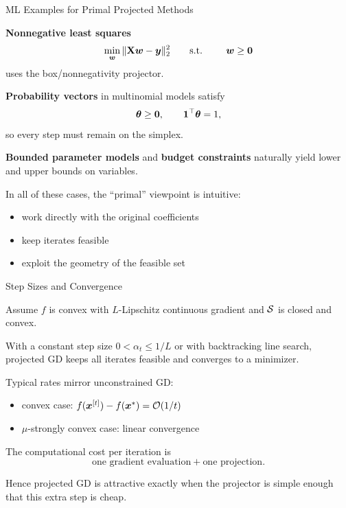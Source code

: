 \documentclass[11pt,compress,t,notes=noshow, xcolor=table]{beamer}
\begin{document}
\begin{framei}[fs=small]{ML Examples for Primal Projected Methods}
\item \textbf{Nonnegative least squares}
$$
\min_{\wv} \|\Xmat \wv - \yv\|_2^2 \qquad \text{s.t. } \qquad \wv \ge \zero
$$
uses the box/nonnegativity projector.
\item \textbf{Probability vectors} in multinomial models satisfy
$$
\thetav \ge \zero, \qquad \one^\top \thetav = 1,
$$
so every step must remain on the simplex.
\item \textbf{Bounded parameter models} and \textbf{budget constraints} naturally yield lower and upper bounds on variables.
\item In all of these cases, the \enquote{primal} viewpoint is intuitive:
\begin{itemize}
\item work directly with the original coefficients
\item keep iterates feasible
\item exploit the geometry of the feasible set
\end{itemize}
\end{framei}


\begin{framei}[fs=small]{Step Sizes and Convergence}
\item Assume $f$ is convex with $L$-Lipschitz continuous gradient and $\S$ is closed and convex.
\item With a constant step size $0 < \alpha_t \le 1 / L$ or with backtracking line search, projected GD keeps all iterates feasible and converges to a minimizer.
\item Typical rates mirror unconstrained GD:
\begin{itemize}
\item convex case: $f(\xv^{[t]}) - f(\xvs) = \order(1/t)$
\item $\mu$-strongly convex case: linear convergence
\end{itemize}
\item The computational cost per iteration is
$$
\text{one gradient evaluation} + \text{one projection}.
$$
\item Hence projected GD is attractive exactly when the projector is simple enough that this extra step is cheap.
\end{framei}
\end{document}
